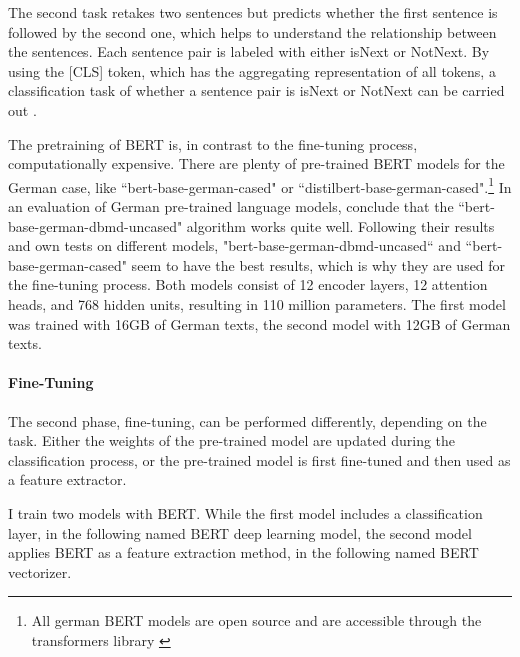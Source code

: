 \documentclass[12pt, a4paper, titlepage]{article}
\begin{document}
The second task retakes two sentences but predicts whether the first sentence is followed by the second one, which helps to understand the relationship between the sentences. Each sentence pair is labeled with either isNext or NotNext. By using the [CLS] token, which has the aggregating representation of all tokens, a classification task of whether a sentence pair is isNext or NotNext can be carried out \citep{ravichandiran2021,devlin2018}.

The pretraining of \ac{BERT} is, in contrast to the fine-tuning process, computationally expensive. There are plenty of pre-trained \ac{BERT} models for the German case, like ``bert-base-german-cased" or ``distilbert-base-german-cased".\footnote{All german \ac{BERT} models are open source and are accessible through the transformers library \citep{wolf2020}} In an evaluation of German pre-trained language models, \citet{assenmacher2021} conclude that the ``bert-base-german-dbmd-uncased" algorithm works quite well. Following their results and own tests on different models, "bert-base-german-dbmd-uncased`` and ``bert-base-german-cased" seem to have the best results, which is why they are used for the fine-tuning process. Both models consist of 12 encoder layers, 12 attention heads, and 768 hidden units, resulting in 110 million parameters. The first model was trained with 16GB of German texts, the second model with 12GB of German texts. 

\paragraph{Fine-Tuning}
The second phase, fine-tuning, can be performed differently, depending on the task. Either the weights of the pre-trained model are updated during the classification process, or the pre-trained model is first fine-tuned and then used as a feature extractor. 

I train two models with \ac{BERT}. While the first model includes a classification layer, in the following named \ac{BERT} deep learning model, the second model applies \ac{BERT} as a feature extraction method, in the following named \ac{BERT} vectorizer. 
\end{document}
